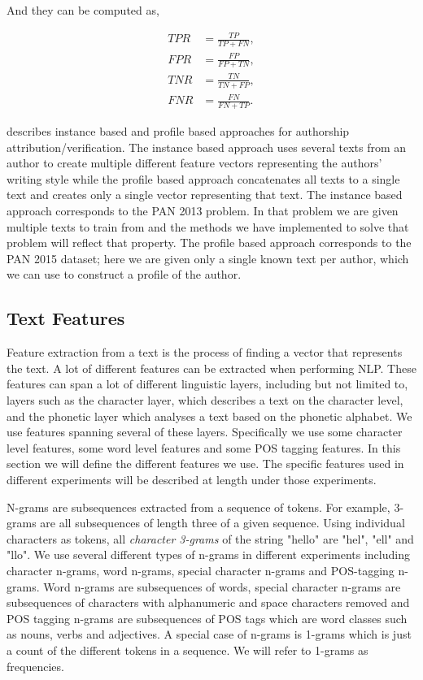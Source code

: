 And they can be computed as,

\begin{align}
    TPR &= \frac{TP}{TP + FN}, \\
    FPR &= \frac{FP}{FP + TN}, \\
    TNR &= \frac{TN}{TN + FP}, \\
    FNR &= \frac{FN}{FN + TP}.
\end{align}

\cite{stamatos2009} describes instance based and profile based approaches for
authorship attribution/verification. The instance based approach uses several
texts from an author to create multiple different feature vectors representing
the authors' writing style while the profile based approach concatenates all
texts to a single text and creates only a single vector representing that text.
The instance based approach corresponds to the PAN 2013 problem. In that problem
we are given multiple texts to train from and the methods we have implemented to
solve that problem will reflect that property. The profile based approach
corresponds to the PAN 2015 dataset; here we are given only a single known text
per author, which we can use to construct a profile of the author.

\subsection{Text Features} \label{subsec:method:text_features} 

Feature extraction from a text is the process of finding a vector that
represents the text. A lot of different features can be extracted
when performing \gls{NLP}. These features can span a lot of different linguistic
layers, including but not limited to, layers such as the character layer, which
describes a text on the character level, and the phonetic layer which analyses a
text based on the phonetic alphabet. We use features spanning several of these
layers. Specifically we use some character level features, some word level
features and some \gls{POS} tagging features. In this section we will define the
different features we use. The specific features used in different experiments
will be described at length under those experiments.

N-grams are subsequences extracted from a sequence of tokens. For example,
3-grams are all subsequences of length three of a given sequence. Using
individual characters as tokens, all \textit{character 3-grams} of the string
"hello" are "hel", "ell" and "llo". We use several different types of n-grams
in different experiments including character n-grams, word n-grams, special
character n-grams and \gls{POS}-tagging n-grams. Word n-grams are subsequences
of words, special character n-grams are subsequences of characters with
alphanumeric and space characters removed and \gls{POS} tagging n-grams are
subsequences of \gls{POS} tags which are word classes such as nouns, verbs and
adjectives. A special case of n-grams is 1-grams which is just a count of the
different tokens in a sequence. We will refer to 1-grams as frequencies.

